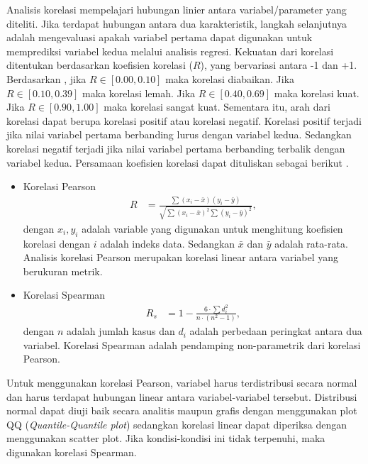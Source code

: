 \begin{spacing}{1.5}
		Analisis korelasi mempelajari hubungan linier antara variabel/parameter yang diteliti. Jika terdapat hubungan antara dua karakteristik, langkah selanjutnya adalah mengevaluasi apakah variabel pertama dapat digunakan untuk memprediksi variabel kedua melalui analisis regresi. Kekuatan dari korelasi ditentukan berdasarkan koefisien korelasi ($R$), yang bervariasi antara -1 dan +1. Berdasarkan , jika $R\in[0.00,0.10]$ maka korelasi diabaikan. Jika $R\in[0.10,0.39]$ maka korelasi lemah. Jika $R\in[0.40,0.69]$ maka korelasi kuat. Jika $R\in[0.90,1.00]$ maka korelasi sangat kuat. Sementara itu, arah dari korelasi dapat berupa korelasi positif atau korelasi negatif. Korelasi positif terjadi jika nilai variabel pertama berbanding lurus dengan variabel kedua. Sedangkan korelasi negatif terjadi jika nilai variabel pertama berbanding terbalik dengan variabel kedua. Persamaan koefisien korelasi dapat dituliskan sebagai berikut  \cite{hidayat2023relationship,Haditiar2020,zhao2022spearman}.
		\begin{itemize}
			\item Korelasi Pearson
			\begin{equation}
				\begin{aligned}
					R &= \frac{\sum (x_i - \bar{x})(y_i - \bar{y})}{\sqrt{\sum (x_i-\bar{x})^2\sum (y_i-\bar{y})^2}},
				\end{aligned}
			\end{equation}
			dengan $x_i, y_i$ adalah variable yang digunakan untuk menghitung koefisien korelasi dengan $i$ adalah indeks data. Sedangkan $\bar{x}$ dan $\bar{y}$ adalah rata-rata. Analisis korelasi Pearson merupakan korelasi linear antara variabel yang berukuran metrik.
			\item Korelasi Spearman
			\begin{equation}
				\begin{aligned}
					R_s &= 1-\frac{6\cdot\sum d_i^2}{n\cdot(n^2-1)},
				\end{aligned}
			\end{equation}
			dengan $n$ adalah jumlah kasus dan $d_i$ adalah perbedaan peringkat antara dua variabel. Korelasi Spearman adalah pendamping non-parametrik dari korelasi Pearson.
		\end{itemize}
	
		Untuk menggunakan korelasi Pearson, variabel harus terdistribusi secara normal dan harus terdapat hubungan linear antara variabel-variabel tersebut. Distribusi normal dapat diuji baik secara analitis maupun grafis dengan menggunakan plot QQ (\textit{Quantile-Quantile plot}) sedangkan korelasi linear dapat diperiksa dengan menggunakan scatter plot. Jika kondisi-kondisi ini tidak terpenuhi, maka digunakan korelasi Spearman.
		

\end{spacing}
